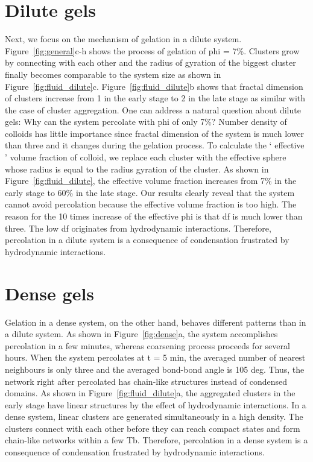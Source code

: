\section{Dilute gels} %
Next, we focus on the mechanism of gelation in a dilute system.
Figure~\ref{fig:general}c-h shows the process of gelation of phi = 7\%.
Clusters grow by connecting with each other and the radius of gyration of the biggest cluster finally becomes comparable to the system size as shown in Figure~\ref{fig:fluid_dilute}c. 
Figure~\ref{fig:fluid_dilute}b shows that fractal dimension of clusters increase from 1 in the early stage to 2 in the late stage as similar with the case of cluster aggregation.
One can address a natural question about dilute gels: Why can the system percolate with phi of only 7\%?
Number density of colloids has little importance since fractal dimension of the system is much lower than three and it changes during the gelation process.
To calculate the ‘ effective ’ volume fraction of colloid, we replace each cluster with the effective sphere whose radius is equal to the radius gyration of the cluster.
As shown in Figure~\ref{fig:fluid_dilute}, the effective volume fraction increases from 7\% in the early stage to 60\% in the late stage.
Our results clearly reveal that the system cannot avoid percolation because the effective volume fraction is too high.
The reason for the 10 times increase of the effective phi is that df is much lower than three.
The low df originates from hydrodynamic interactions.
Therefore, percolation in a dilute system is a consequence of condensation frustrated by hydrodynamic interactions.





\section{Dense gels} %
Gelation in a dense system, on the other hand, behaves different patterns than in a dilute system.
As shown in Figure~\ref{fig:dense}a, the system accomplishes percolation in a few minutes, whereas coarsening process proceeds for several hours.
When the system percolates at t = 5 min, the averaged number of nearest neighbours is only three and the averaged bond-bond angle is 105 deg.
Thus, the network right after percolated has chain-like structures instead of condensed domains.
As shown in Figure~\ref{fig:fluid_dilute}a, the aggregated clusters in the early stage have linear structures by the effect of hydrodynamic interactions.
In a dense system, linear clusters are generated simultaneously in a high density.
The clusters connect with each other before they can reach compact states and form chain-like networks within a few Tb.
Therefore, percolation in a dense system is a consequence of condensation frustrated by hydrodynamic interactions.

